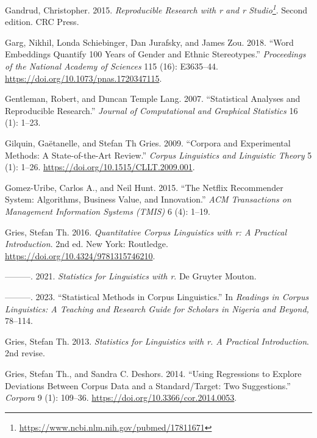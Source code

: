 \documentclass[
  letterpaper,
]{latex/krantz}
\newlength{\cslhangindent}
\newenvironment{CSLReferences}[2] %
 {\begin{list}{}{%
  \setlength{\itemindent}{0pt}
  \setlength{\leftmargin}{0pt}
  \setlength{\parsep}{0pt}
  \ifodd #1
   \setlength{\leftmargin}{\cslhangindent}
   \setlength{\itemindent}{-1\cslhangindent}
  \fi
  \setlength{\itemsep}{#2\baselineskip}}}
 {\end{list}}
\theoremstyle{definition}
\theoremstyle{remark}
\DeclareRobustCommand{\href}[2]{#2\footnote{\url{#1}}}
\begin{document}
\begin{CSLReferences}{1}{0}
Gandrud, Christopher. 2015.
\emph{\href{https://www.ncbi.nlm.nih.gov/pubmed/17811671}{Reproducible
Research with r and r Studio}}. Second edition. CRC Press.

Garg, Nikhil, Londa Schiebinger, Dan Jurafsky, and James Zou. 2018.
{``Word Embeddings Quantify 100 Years of Gender and Ethnic
Stereotypes.''} \emph{Proceedings of the National Academy of Sciences}
115 (16): E3635--44. \url{https://doi.org/10.1073/pnas.1720347115}.

Gentleman, Robert, and Duncan Temple Lang. 2007. {``Statistical Analyses
and Reproducible Research.''} \emph{Journal of Computational and
Graphical Statistics} 16 (1): 1--23.

Gilquin, Gaëtanelle, and Stefan Th Gries. 2009. {``Corpora and
Experimental Methods: A State-of-the-Art Review.''} \emph{Corpus
Linguistics and Linguistic Theory} 5 (1): 1--26.
\url{https://doi.org/10.1515/CLLT.2009.001}.

Gomez-Uribe, Carlos A., and Neil Hunt. 2015. {``The Netflix Recommender
System: Algorithms, Business Value, and Innovation.''} \emph{ACM
Transactions on Management Information Systems (TMIS)} 6 (4): 1--19.

Gries, Stefan Th. 2016. \emph{Quantitative Corpus Linguistics with r: A
Practical Introduction}. 2nd ed. New York: Routledge.
\url{https://doi.org/10.4324/9781315746210}.

---------. 2021. \emph{Statistics for Linguistics with r}. De Gruyter
Mouton.

---------. 2023. {``Statistical Methods in Corpus Linguistics.''} In
\emph{Readings in Corpus Linguistics: A Teaching and Research Guide for
Scholars in Nigeria and Beyond,} 78--114.

Gries, Stefan Th. 2013. \emph{Statistics for Linguistics with r. A
Practical Introduction}. 2nd revise.

Gries, Stefan Th., and Sandra C. Deshors. 2014. {``Using Regressions to
Explore Deviations Between Corpus Data and a Standard/Target: Two
Suggestions.''} \emph{Corpora} 9 (1): 109--36.
\url{https://doi.org/10.3366/cor.2014.0053}.


\end{CSLReferences}
\end{document}
